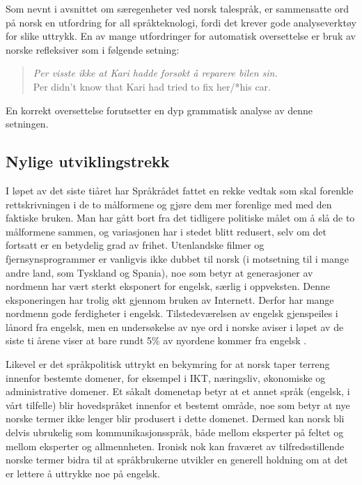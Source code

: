 \begin{multicols}{2}
Som nevnt i avsnittet om særegenheter ved norsk talespråk, er sammensatte ord på norsk en utfordring for all språkteknologi, fordi det krever gode analyseverktøy for slike uttrykk.
En av mange utfordringer for automatisk oversettelse er bruk av norske refleksiver som i følgende setning:

\begin{quote}
	\emph{Per visste ikke at Kari hadde forsøkt å reparere bilen \emph{sin}.}\\
	Per didn’t know that Kari had tried to fix her/*his car.
\end{quote}

En korrekt oversettelse forutsetter en dyp grammatisk analyse av denne setningen.

\subsection{Nylige utviklingstrekk}

I løpet av det siste tiåret har Språkrådet fattet en rekke vedtak som skal forenkle rettskrivningen i de to målformene og gjøre dem mer forenlige med med den faktiske bruken. Man har gått bort fra det tidligere politiske målet om å slå de to målformene sammen, og variasjonen har i stedet blitt redusert, selv om det fortsatt er en betydelig grad av frihet.
Utenlandske filmer og fjernsynsprogrammer er vanligvis ikke dubbet til norsk (i motsetning til i mange andre land, som Tyskland og Spania), noe som betyr at generasjoner av nordmenn har vært sterkt eksponert for engelsk, særlig i oppveksten. 
Denne eksponeringen har trolig økt gjennom bruken av Internett. 
Derfor har mange nordmenn gode ferdigheter i engelsk. 
Tilstedeværelsen av engelsk gjenspeiles i lånord fra engelsk, men en undersøkelse av nye ord i norske aviser i løpet av de siste ti årene viser at bare rundt 5\% av nyordene kommer fra engelsk \cite{And:2011}.

Likevel er det språkpolitisk uttrykt en bekymring \cite{nih:2005} for at norsk taper terreng innenfor bestemte domener, for eksempel i IKT, næringsliv, økonomiske og administrative domener. 
Et såkalt domenetap betyr at et annet språk (engelsk, i vårt tilfelle) blir hovedspråket innenfor et bestemt område, noe som betyr at nye norske termer ikke lenger blir produsert i dette domenet. 
Dermed kan norsk bli delvis ubrukelig som kommunikasjonsspråk, både mellom eksperter på feltet og mellom eksperter og allmennheten. Ironisk nok kan fraværet av tilfredsstillende norske termer bidra til at språkbrukerne utvikler en generell holdning om at det er lettere å uttrykke noe på engelsk. 


\end{multicols}
